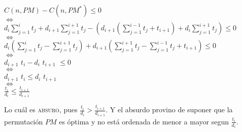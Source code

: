 \documentclass[11pt,a4paper]{article}
\newcommand{\sisosi}{\Leftrightarrow}
\newcommand{\Frac}{\displaystyle\frac}
\newcommand{\suma}[2]{\sum\limits_{#1}^{#2}}
\newcommand{\bc}{\begin{center}}
\newcommand{\ec}{\end{center}}
\begin{document}
\bc
$C(n, PM) - C(n,PM^*) \le 0$\\
$\sisosi$\\
$ d_i\suma{j=1}{i}t_j + d_{i+1}\suma{j=1}{i+1}t_j - (d_{i+1}(\suma{j=1}{i-1}t_j + t_{i+1})+ d_i\suma{j=1}{i+1}t_j) \le 0$\\
$\sisosi$\\
$d_{i}(\suma{j=1}{i}t_j - \suma{j=1}{i+1}t_j) + d_{i+1}(\suma{j=1}{i+1}t_j - \suma{j=1}{i-1}t_j + t_{i+1}) \le 0$\\
$\sisosi$\\
$d_{i+1}$ $t_i - d_i$ $t_{i+1}$ $\le 0$\\
$\sisosi$\\
$d_{i+1}$ $t_i \le d_i$ $t_{i+1}$\\
$\sisosi$\\
$\frac{t_i}{d_i} \le \frac{t_{i+1}}{d_{i+1}}$\\
\ec

Lo cu\'al es \textsc{absuro}, pues $\frac{t_i}{d_i} > \frac{t_{i+1}}{d_{i+1}}$. Y el absurdo provino de suponer que la permutaci\'on $PM$ es \'optima y no est\'a ordenada de menor a mayor segun $\frac{t_i}{d_i}$.\\









\end{document}
